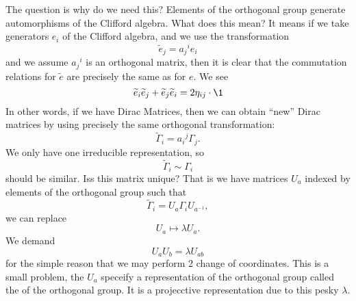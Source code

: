 The question is why do we need this? Elements of the orthogonal group
generate automorphisms of the Clifford algebra. What does this
mean? It means if we take generators $e_{i}$ of the Clifford
algebra, and we use the transformation
\begin{equation}
\widetilde{e}_{j} = {a_{j}}^{i}e_{i}
\end{equation}
and we assume ${a_{j}}^{i}$ is an orthogonal matrix, then it is
clear that the commutation relations for $\widetilde{e}$ are
precisely the same as for $e$. We see
\begin{equation}
\widetilde{e}_{i}\widetilde{e}_{j}+\widetilde{e}_{j}\widetilde{e}_{i}=2\eta_{ij}\cdot\1
\end{equation}
In other words, if we have Dirac Matrices, then we can obtain
``new'' Dirac matrices by using precisely the same orthogonal
transformation:
\begin{equation}
\widetilde{\Gamma}_{i} = {a_{i}}^{j}\Gamma_{j}.
\end{equation}
We only have one irreducible representation, so
\begin{equation}
\widetilde\Gamma_{i}\sim\Gamma_{i}
\end{equation}
should be similar. Iss this matrix unique? That is we have
matrices $U_{a}$ indexed by elements of the orthogonal group such that
\begin{equation}
\widetilde\Gamma_{i}=U_{a}\Gamma_{i}U_{a^{-1}},
\end{equation}
we can replace
\begin{equation}
U_{a}\mapsto\lambda U_{a}.
\end{equation}
We demand
\begin{equation}
U_{a}U_{b}=\lambda U_{ab}
\end{equation}
for the simple reason that we may perform 2 change of
coordinates. This is a small problem, the $U_{a}$ speceify a
representation of the orthogonal group called the  of the orthogonal group. It is a projecctive
representation due to this pesky $\lambda$.
